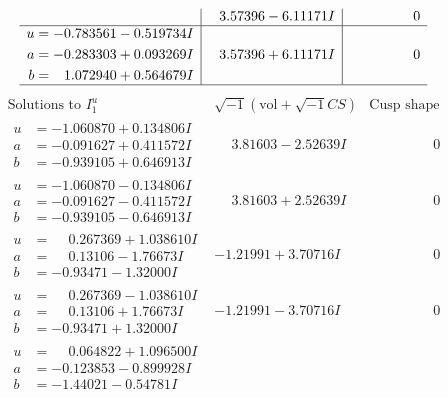 \documentclass[1p]{elsarticle_modified}
\theoremstyle{definition}
\newcommand{\I}{\sqrt{-1}}
\begin{document}
$$\begin{array}{c|c|c}
 & \phantom{-}3.57396 - 6.11171 I & \phantom{-0.000000 } 0 \\ \hline\begin{aligned}
u &= -0.783561 - 0.519734 I \\
a &= -0.283303 + 0.093269 I \\
b &= \phantom{-}1.072940 + 0.564679 I\end{aligned}
 & \phantom{-}3.57396 + 6.11171 I & \phantom{-0.000000 } 0\\
 \hline 
 \end{array}$$\newpage$$\begin{array}{c|c|c}  
\text{Solutions to }I^u_{1}& \I (\text{vol} + \sqrt{-1}CS) & \text{Cusp shape}\\
 \hline 
\begin{aligned}
u &= -1.060870 + 0.134806 I \\
a &= -0.091627 + 0.411572 I \\
b &= -0.939105 + 0.646913 I\end{aligned}
 & \phantom{-}3.81603 - 2.52639 I & \phantom{-0.000000 } 0 \\ \hline\begin{aligned}
u &= -1.060870 - 0.134806 I \\
a &= -0.091627 - 0.411572 I \\
b &= -0.939105 - 0.646913 I\end{aligned}
 & \phantom{-}3.81603 + 2.52639 I & \phantom{-0.000000 } 0 \\ \hline\begin{aligned}
u &= \phantom{-}0.267369 + 1.038610 I \\
a &= \phantom{-}0.13106 - 1.76673 I \\
b &= -0.93471 - 1.32000 I\end{aligned}
 & -1.21991 + 3.70716 I & \phantom{-0.000000 } 0 \\ \hline\begin{aligned}
u &= \phantom{-}0.267369 - 1.038610 I \\
a &= \phantom{-}0.13106 + 1.76673 I \\
b &= -0.93471 + 1.32000 I\end{aligned}
 & -1.21991 - 3.70716 I & \phantom{-0.000000 } 0 \\ \hline\begin{aligned}
u &= \phantom{-}0.064822 + 1.096500 I \\
a &= -0.123853 - 0.899928 I \\
b &= -1.44021 - 0.54781 I\end{aligned}

\end{array}$$
\end{document}
